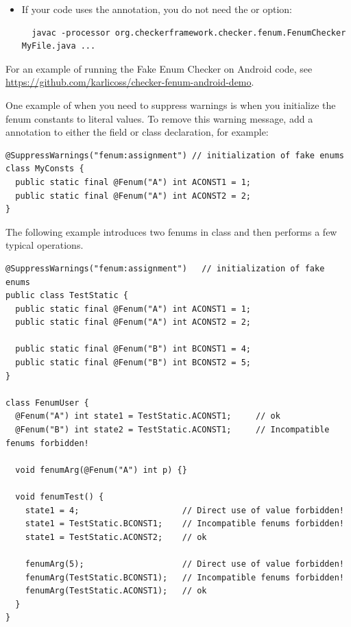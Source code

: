 \begin{itemize}
\begin{alltt}
  .../myProject/bin/myPackage/qual/MyFenum.class
\end{alltt}

The two options can be used at the same time to provide groups of annotations
from directories, and individually named annotations.

\item
If your code uses the  annotation, you do
not need the  or  option:

\begin{Verbatim}
  javac -processor org.checkerframework.checker.fenum.FenumChecker MyFile.java ...
\end{Verbatim}

\end{itemize}

For an example of running the Fake Enum Checker on Android code, see
\url{https://github.com/karlicoss/checker-fenum-android-demo}.



One example of when you need to suppress warnings is when you initialize the
fenum constants to literal values.
To remove this warning message, add a  annotation to either
the field or class declaration, for example:

\begin{Verbatim}
@SuppressWarnings("fenum:assignment") // initialization of fake enums
class MyConsts {
  public static final @Fenum("A") int ACONST1 = 1;
  public static final @Fenum("A") int ACONST2 = 2;
}
\end{Verbatim}




The following example introduces two fenums in class 
and then performs a few typical operations.

\begin{Verbatim}
@SuppressWarnings("fenum:assignment")   // initialization of fake enums
public class TestStatic {
  public static final @Fenum("A") int ACONST1 = 1;
  public static final @Fenum("A") int ACONST2 = 2;

  public static final @Fenum("B") int BCONST1 = 4;
  public static final @Fenum("B") int BCONST2 = 5;
}

class FenumUser {
  @Fenum("A") int state1 = TestStatic.ACONST1;     // ok
  @Fenum("B") int state2 = TestStatic.ACONST1;     // Incompatible fenums forbidden!

  void fenumArg(@Fenum("A") int p) {}

  void fenumTest() {
    state1 = 4;                     // Direct use of value forbidden!
    state1 = TestStatic.BCONST1;    // Incompatible fenums forbidden!
    state1 = TestStatic.ACONST2;    // ok

    fenumArg(5);                    // Direct use of value forbidden!
    fenumArg(TestStatic.BCONST1);   // Incompatible fenums forbidden!
    fenumArg(TestStatic.ACONST1);   // ok
  }
}
\end{Verbatim}

